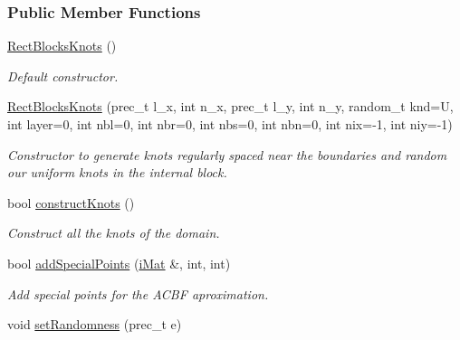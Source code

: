 \subsubsection*{Public Member Functions}
\begin{CompactItemize}
\item 
\hypertarget{classRectBlocksKnots_dd03c45260c74a8c234ef495eeb72a14}{
\hyperlink{classRectBlocksKnots_dd03c45260c74a8c234ef495eeb72a14}{RectBlocksKnots} ()}
\label{classRectBlocksKnots_dd03c45260c74a8c234ef495eeb72a14}

\begin{CompactList}\small\item\em Default constructor. \item\end{CompactList}\item 
\hyperlink{classRectBlocksKnots_ecfccc1adba95a40cafb189235884318}{RectBlocksKnots} (prec\_\-t l\_\-x, int n\_\-x, prec\_\-t l\_\-y, int n\_\-y, random\_\-t knd=U, int layer=0, int nbl=0, int nbr=0, int nbs=0, int nbn=0, int nix=-1, int niy=-1)
\begin{CompactList}\small\item\em Constructor to generate knots regularly spaced near the boundaries and random our uniform knots in the internal block. \item\end{CompactList}\item 
bool \hyperlink{classRectBlocksKnots_cd9a8af5b8a5a241d149ff0b1efb4318}{constructKnots} ()
\begin{CompactList}\small\item\em Construct all the knots of the domain. \item\end{CompactList}\item 
bool \hyperlink{classRectBlocksKnots_c159f6753592d796737579888eed6c6d}{addSpecialPoints} (\hyperlink{Traits_8hpp_a667f32088e1c93b532a640fe84dc4cd}{iMat} \&, int, int)
\begin{CompactList}\small\item\em Add special points for the ACBF aproximation. \item\end{CompactList}\item 
\hypertarget{classRectBlocksKnots_df90309c6260634f159534d63dc80187}{
void \hyperlink{classRectBlocksKnots_df90309c6260634f159534d63dc80187}{setRandomness} (prec\_\-t e)}
\label{classRectBlocksKnots_df90309c6260634f159534d63dc80187}


\end{CompactItemize}

